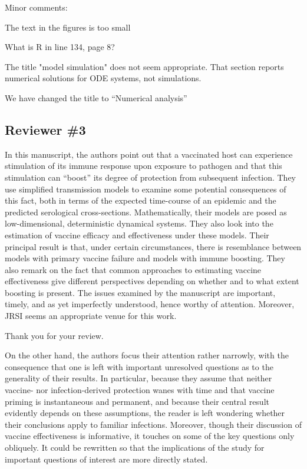 \documentclass[12pt]{article}
\newcommand{\rev}{\subsection*}
\newcommand{\revtext}{\textsf}
\begin{document}
\revtext{Minor comments:}

\revtext{The text in the figures is too small}

\revtext{What is R in line 134, page 8?}

\revtext{The title "model simulation" does not seem appropriate. That section reports numerical solutions for ODE systems, not simulations.}

We have changed the title to ``Numerical analysis''

\rev{Reviewer \#3}

\revtext{In this manuscript, the authors point out that a vaccinated host can experience stimulation of its immune response upon exposure to pathogen and that this stimulation can “boost” its degree of protection from subsequent infection. They use simplified transmission models to examine some potential consequences of this fact, both in terms of the expected time-course of an epidemic and the predicted serological cross-sections. Mathematically, their models are posed as low-dimensional, deterministic dynamical systems. They also look into the estimation of vaccine efficacy and effectiveness under these models. Their principal result is that, under certain circumstances, there is resemblance between models with primary vaccine failure and models with immune boosting. They also remark on the fact that common approaches to estimating vaccine effectiveness give different perspectives depending on whether and to what extent boosting is present. The issues examined by the manuscript are important, timely, and as yet imperfectly understood, hence worthy of attention. Moreover, JRSI seems an appropriate venue for this work.}

Thank you for your review.

\revtext{On the other hand, the authors focus their attention rather narrowly, with the consequence that one is left with important unresolved questions as to the generality of their results. In particular, because they assume that neither vaccine- nor infection-derived protection wanes with time and that vaccine priming is instantaneous and permanent, and because their central result evidently depends on these assumptions, the reader is left wondering whether their conclusions apply to familiar infections. Moreover, though their discussion of vaccine effectiveness is informative, it touches on some of the key questions only obliquely. It could be rewritten so that the implications of the study for important questions of interest are more directly stated.}
\end{document}
